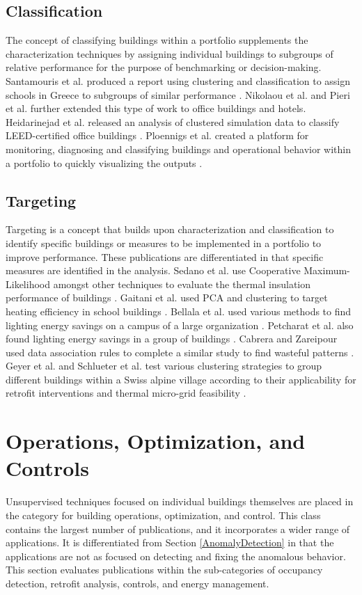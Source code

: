 \subsection{Classification}
The concept of classifying buildings within a portfolio supplements the characterization techniques by assigning individual buildings to subgroups of relative performance for the purpose of benchmarking or decision-making. Santamouris et al. produced a report using clustering and classification to assign schools in Greece to subgroups of similar performance \citep{santamouris_using_2007}. Nikolaou et al. and Pieri et al. further extended this type of work to office buildings and hotels\citep{nikolaou_application_2012,pieri_identifying_2015}. Heidarinejad et al. released an analysis of clustered simulation data to classify LEED-certified office buildings \citep{heidarinejad_cluster_2014}. Ploennigs et al. created a platform for monitoring, diagnosing and classifying buildings and operational behavior within a portfolio to quickly visualizing the outputs \citep{ploennigs_e2-diagnoser:_2014}.

\subsection{Targeting}
Targeting is a concept that builds upon characterization and classification to identify specific buildings or measures to be implemented in a portfolio to improve performance. These publications are differentiated in that specific measures are identified in the analysis. Sedano et al. use Cooperative Maximum-Likelihood amongst other techniques to evaluate the thermal insulation performance of buildings \citep{sedano_improving_2009}. Gaitani et al. used PCA and clustering to target heating efficiency in school buildings \citep{gaitani_using_2010}. Bellala et al. used various methods to find lighting energy savings on a campus of a large organization \citep{bellala_towards_2011}. Petcharat et al. also found lighting energy savings in a group of buildings \citep{petcharat_assessment_2012}. Cabrera and Zareipour used data association rules to complete a similar study to find wasteful patterns \citep{cabrera_data_2013}. Geyer et al.  and Schlueter et al. test various clustering strategies to group different buildings within a Swiss alpine village according to their applicability for retrofit interventions \citep{geyer_application_2016} and thermal micro-grid feasibility \citep{schlueter_analysis_2016}.

\section{Operations, Optimization, and Controls}
\label{Operations}
Unsupervised techniques focused on individual buildings themselves are placed in the category for building operations, optimization, and control. This class contains the largest number of publications, and it incorporates a wider range of applications. It is differentiated from Section \ref{AnomalyDetection} in that the applications are not as focused on detecting and fixing the anomalous behavior. This section evaluates publications within the sub-categories of occupancy detection, retrofit analysis, controls, and energy management. 


